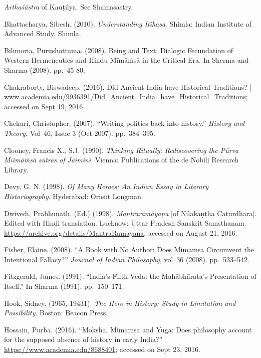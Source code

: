 \begin{thebibliography}{99}
 \textit{Arthaśāstra} of Kauṭilya. See Shamasastry.

  Bhattacharya, Sibesh. (2010). \textit{Understanding Itihasa}. Shimla: Indian Institute of Advanced Study, Shimla.

  Bilimoria, Purushottama. (2008). Being and Text: Dialogic Fecundation of Western Hermeneutics and Hindu Mīmāṁsā in the Critical Era. In Sherma and Sharma (2008). pp.~45-80.

  Chakraborty, Biswadeep. (2016). Did Ancient India have Historical Traditions? | \url{www.academia.edu/9936391/Did_Ancient_India_have_Historical_Traditions}; accessed on Sept 19, 2016.

  Chekuri, Christopher. (2007). “Writing politics back into history.” \textit{History and Theory.} Vol~46, Issue 3 (Oct 2007). pp.~384--395.

  Clooney, Francis X., S.J. (1990). \textit{Thinking Ritually: Rediscovering the Pūrva Mīimāṁsā sūtras of Jaimini}. Vienna: Publications of the de Nobili Research Library.

  Devy, G. N. (1998). \textit{Of Many Heroes: An Indian Essay in Literary Historiography}. Hyderabad: Orient Longman.

  Dwivedi, Prabhunath. (Ed.) (1998). \textit{Mantrarāmāyaṇa} [of Nīlakaṇṭha Caturdhara]. Edited with Hindi translation. Lucknow: Uttar Pradesh Sanskrit Samsthanam. \url{https://archive.org/details/MantraRamayana}, accessed on August 21, 2016. 

  Fisher, Elaine. (2008). “A Book with No Author: Does Mimamsa Circumvent the Intentional Fallacy?” \textit{Journal of Indian Philosophy}, vol~36 (2008). pp.~533--542.

  Fitzgerald, James. (1991). “India’s Fifth Veda: the Mahābhārata’s Presentation of Itself.” In Sharma (1991). pp.~150--171.

  Hook, Sidney. (1965, 19431). \textit{The Hero in History: Study in Limitation and Possibility}. Boston: Beacon Press.

  Hossain, Purba. (2016). “Moksha, Mimamsa and Yuga: Does philosophy account for the supposed absence of history in early India?” \url{https://www.academia.edu/8688401}; accessed on Sept 23, 2016.


\end{thebibliography}
